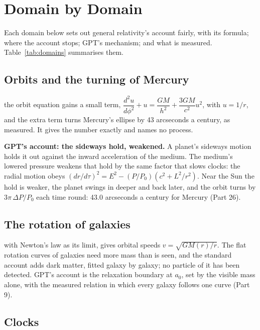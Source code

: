 \documentclass[11pt,a4paper]{article}
\begin{document}
\section{Domain by Domain}

Each domain below sets out general relativity's account fairly, with its formula; where the account stops; GPT's mechanism; and what is measured. Table~\ref{tab:domains} summarises them.

\subsection{Orbits and the turning of Mercury}

 the orbit equation gains a small term, $\dfrac{d^2u}{d\phi^2} + u = \dfrac{GM}{h^2} + \dfrac{3GM}{c^2}u^2$, with $u = 1/r$, and the extra term turns Mercury's ellipse by 43 arcseconds a century, as measured. It gives the number exactly and names no process.

\begin{hypbar}
\textbf{GPT's account: the sideways hold, weakened.} A planet's sideways motion holds it out against the inward acceleration of the medium. The medium's lowered pressure weakens that hold by the same factor that slows clocks: the radial motion obeys $(dr/d\tau)^2 = E^2 - (P/P_0)(c^2 + L^2/r^2)$. Near the Sun the hold is weaker, the planet swings in deeper and back later, and the orbit turns by $3\pi\,\Delta P/P_0$ each time round: 43.0 arcseconds a century for Mercury (Part 26).\footnotemark{}
\end{hypbar}

\subsection{The rotation of galaxies}

 with Newton's law as its limit, gives orbital speeds $v = \sqrt{GM(r)/r}$. The flat rotation curves of galaxies need more mass than is seen, and the standard account adds dark matter, fitted galaxy by galaxy; no particle of it has been detected. GPT's account is the relaxation boundary at $a_0$, set by the visible mass alone, with the measured relation in which every galaxy follows one curve (Part 9).

\subsection{Clocks}
\end{document}
